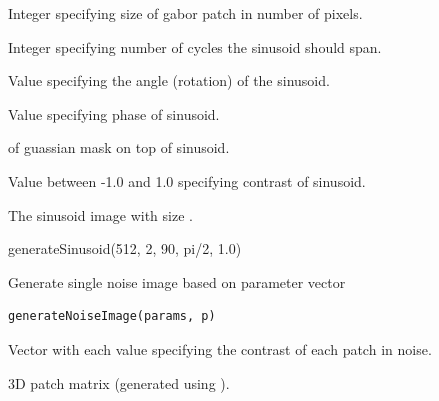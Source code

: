 \documentclass[letterpaper]{book}
\begin{document}
%
\begin{Arguments}
\begin{ldescription}
\item[\code{img\_size}] Integer specifying size of gabor patch in number of pixels.

\item[\code{cycles}] Integer specifying number of cycles the sinusoid should span.

\item[\code{angle}] Value specifying the angle (rotation) of the sinusoid.

\item[\code{phase}] Value specifying phase of sinusoid.

\item[\code{sigma}] of guassian mask on top of sinusoid.

\item[\code{contrast}] Value between -1.0 and 1.0 specifying contrast of sinusoid.
\end{ldescription}
\end{Arguments}
%
\begin{Value}
The sinusoid image with size .
\end{Value}
%
\begin{Examples}
\begin{ExampleCode}
generateSinusoid(512, 2, 90, pi/2, 1.0)
\end{ExampleCode}
\end{Examples}
%
\begin{Description}
Generate single noise image based on parameter vector
\end{Description}
%
\begin{Usage}
\begin{verbatim}
generateNoiseImage(params, p)
\end{verbatim}
\end{Usage}
%
\begin{Arguments}
\begin{ldescription}
\item[\code{params}] Vector with each value specifying the contrast of each patch in noise.

\item[\code{p}] 3D patch matrix (generated using ).
\end{ldescription}
\end{Arguments}
\end{document}

